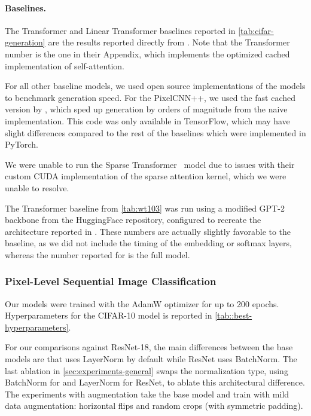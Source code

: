 \paragraph{Baselines.}
The Transformer and Linear Transformer baselines reported in \cref{tab:cifar-generation} are the results reported directly from \citet{katharopoulos2020transformers}.
Note that the Transformer number is the one in their Appendix, which implements the optimized cached implementation of self-attention.

For all other baseline models, we used open source implementations of the models to benchmark generation speed.
For the PixelCNN++, we used the fast cached version by \citet{ramachandran2017fast},
which sped up generation by orders of magnitude from the naive implementation.
This code was only available in TensorFlow, which may have slight differences compared to the rest of the baselines which were implemented in PyTorch.

We were unable to run the Sparse Transformer~\citep{child2019generating} model due to issues with their custom CUDA implementation of the sparse attention kernel, which we were unable to resolve.

The Transformer baseline from \cref{tab:wt103} was run using a modified GPT-2 backbone from the HuggingFace repository, configured to recreate the architecture reported in \citep{baevski2018adaptive}.
These numbers are actually slightly favorable to the baseline, as we did not include the timing of the embedding or softmax layers, whereas the number reported for \methodabbrv{} is the full model.

\subsubsection{Pixel-Level Sequential Image Classification}
\label{sec:experiment-details-general-image}

Our models were trained with the AdamW optimizer for up to 200 epochs.
Hyperparameters for the CIFAR-10 model is reported in \cref{tab::best-hyperparameters}.

For our comparisons against ResNet-18, the main differences between the base models are that \methodabbrv{} uses LayerNorm by default while ResNet uses BatchNorm.
The last ablation in \cref{sec:experiments-general} swaps the normalization type,
using BatchNorm for \methodabbrv{} and LayerNorm for ResNet,
to ablate this architectural difference.
The experiments with augmentation take the base model and train with mild data augmentation: horizontal flips and random crops (with symmetric padding).

